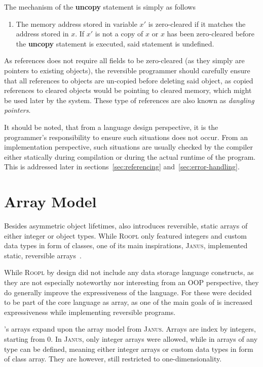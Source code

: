 The mechanism of the \textbf{uncopy} statement is simply as follows
\begin{enumerate}
    \item The memory address stored in variable $x'$ is zero-cleared if it matches the address stored in $x$. If $x'$ is not a copy of $x$ or $x$ has been zero-cleared before the \textbf{uncopy} statement is executed, said statement is undefined.
\end{enumerate}
As references does not require all fields to be zero-cleared (as they simply are pointers to existing objects), the reversible programmer should carefully ensure that all references to objects are un-copied before deleting said object, as copied references to cleared objects would be pointing to cleared memory, which might be used later by the system. These type of references are also known as \textit{dangling pointers}.

It should be noted, that from a language design perspective, it is the programmer's responsibility to ensure such situations does not occur. From an implementation perspective, such situations are usually checked by the compiler either statically during compilation or during the actual runtime of the program. This is addressed later in sections~\ref{sec:referencing} and~\ref{sec:error-handling}.


\section{Array Model}
\label{sec:array-model}
Besides asymmetric object lifetimes, \rooplpp also introduces reversible, static arrays of either integer or object types. While \textsc{Roopl} only featured integers and custom data types in form of classes, one of its main inspirations, \textsc{Janus}, implemented static, reversible arrays~\cite{ty:janus}. 

While \textsc{Roopl} by design did not include any data storage language constructs, as they are not especially noteworthy nor interesting from an OOP perspective, they do generally improve the expressiveness of the language. For \rooplpp these were decided to be part of the core language as array, as one of the main goals of \rooplpp is increased expressiveness while implementing reversible programs.

\rooplpp's arrays expand upon the array model from \textsc{Janus}. Arrays are index by integers, starting from 0. In \textsc{Janus}, only integer arrays were allowed, while in \rooplpp arrays of any type can be defined, meaning either integer arrays or custom data types in form of class array. They are however, still restricted to one-dimensionality.

